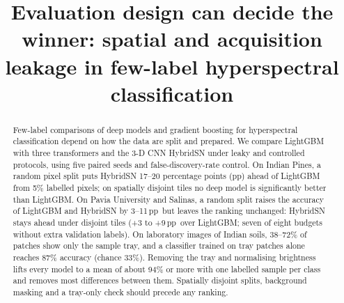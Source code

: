 \documentclass[]{interact}
\newcommand{\pp}{\,pp}
\begin{document}

\title{Evaluation design can decide the winner: spatial and acquisition leakage in few-label hyperspectral classification}

\author{
}

\maketitle

\begin{abstract}
Few-label comparisons of deep models and gradient boosting for hyperspectral classification depend on how the data are split and prepared. We compare LightGBM with three transformers and the 3-D CNN HybridSN under leaky and controlled protocols, using five paired seeds and false-discovery-rate control. On Indian Pines, a random pixel split puts HybridSN 17--20 percentage points (pp) ahead of LightGBM from 5\% labelled pixels; on spatially disjoint tiles no deep model is significantly better than LightGBM. On Pavia University and Salinas, a random split raises the accuracy of LightGBM and HybridSN by 3--11\pp\ but leaves the ranking unchanged: HybridSN stays ahead under disjoint tiles (+3 to +9\pp\ over LightGBM; seven of eight budgets without extra validation labels). On laboratory images of Indian soils, 38--72\% of patches show only the sample tray, and a classifier trained on tray patches alone reaches 87\% accuracy (chance 33\%). Removing the tray and normalising brightness lifts every model to a mean of about 94\% or more with one labelled sample per class and removes most differences between them. Spatially disjoint splits, background masking and a tray-only check should precede any ranking.
\end{abstract}
\end{document}
